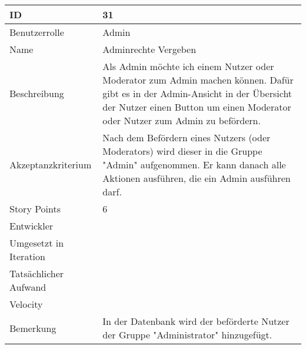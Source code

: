 \begin{tabularx}{\textwidth}{|p{}|X|}
	\hline
	ID & 31 \\
	\hline
	Benutzerrolle & Admin \\
	\hline
	Name & Adminrechte Vergeben\\
	\hline
	Beschreibung & Als Admin möchte ich einem Nutzer oder Moderator zum Admin machen können. Dafür gibt es in der Admin-Ansicht in der Übersicht der Nutzer einen Button um einen Moderator oder Nutzer zum Admin zu befördern.  \\
	\hline
	Akzeptanzkriterium & Nach dem Befördern eines Nutzers (oder Moderators) wird dieser in die Gruppe "Admin" aufgenommen. Er kann danach alle Aktionen ausführen, die ein Admin ausführen darf. \\
	\hline
	Story Points & 6 \\
	\hline
	Entwickler &  \\
	\hline
	Umgesetzt in Iteration & \\
	\hline
	Tatsächlicher Aufwand & \\
	\hline
	Velocity & \\
	\hline
	Bemerkung & In der Datenbank wird der beförderte Nutzer der Gruppe "Administrator" hinzugefügt. \\
	\hline
\end{tabularx}
\vspace{20pt}
